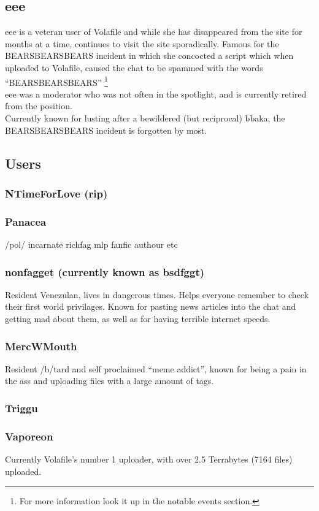 \documentclass[12pt]{report}
\begin{document}
{\subsection{eee}
	eee is a veteran user of Volafile and while she has disappeared from the site for months at a time, continues to visit the site sporadically. Famous for the BEARSBEARSBEARS incident in which she concocted a script which when uploaded to Volafile, caused the chat to be spammed with the words ``BEARSBEARSBEARS''
	\footnote{For more information look it up in the notable events section.}\\
eee was a moderator who was not often in the spotlight, and is currently retired from the position. \\Currently known for lusting after a bewildered (but reciprocal) bbaka, the BEARSBEARSBEARS incident is forgotten by most.

\vfill
\pagebreak
\subsection{Users}


\subsubsection{NTimeForLove (rip)}

\subsubsection{Panacea}
	/pol/ incarnate richfag mlp fanfic authour etc
\subsubsection{nonfagget (currently known as bsdfggt)}
	Resident Venezulan, lives in dangerous times. Helps everyone remember to check their first world privilages. Known for pasting news articles into the chat and getting mad about them, as well as for having terrible internet speeds.
\subsubsection{MercWMouth}
	Resident /b/tard and self proclaimed ``meme addict'', known for being a pain in the ass and uploading files with a large amount of tags.
\subsubsection{Triggu}
\subsubsection{Vaporeon}
	Currently Volafile's number 1 uploader, with over 2.5 Terrabytes (7164 files) uploaded.
}
\end{document}

